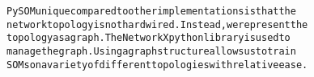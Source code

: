 {{\begin{tabbing}
{\texttt{PySOM\hspace{6pt}unique\hspace{6pt}compared\hspace{6pt}to\hspace{6pt}other\hspace{6pt}implementations\hspace{6pt}is\hspace{6pt}that\hspace{6pt}the}}\\
{\texttt{network\hspace{6pt}topology\hspace{6pt}is\hspace{6pt}not\hspace{6pt}hard\hspace{6pt}wired.\hspace{6pt}Instead,\hspace{6pt}we\hspace{6pt}represent\hspace{6pt}the}}\\
{\texttt{topology\hspace{6pt}as\hspace{6pt}a\hspace{6pt}graph.\hspace{12pt}The\hspace{6pt}NetworkX\hspace{6pt}python\hspace{6pt}library\hspace{6pt}is\hspace{6pt}used\hspace{6pt}to}}\\
{\texttt{manage\hspace{6pt}the\hspace{6pt}graph.\hspace{12pt}Using\hspace{6pt}a\hspace{6pt}graph\hspace{6pt}structure\hspace{6pt}allows\hspace{6pt}us\hspace{6pt}to\hspace{6pt}train}}\\
{\texttt{SOMs\hspace{6pt}on\hspace{6pt}a\hspace{6pt}variety\hspace{6pt}of\hspace{6pt}different\hspace{6pt}topologies\hspace{6pt}with\hspace{6pt}relative\hspace{6pt}ease.}}\\

\end{tabbing}}}
